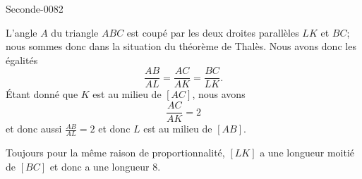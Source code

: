 
\begin{corrige}{Seconde-0082}


    \begin{multicols}{2}

        L'angle \( A\) du triangle \( ABC\) est coupé par les deux droites parallèles \( LK\) et \( BC\); nous sommes donc dans la situation du théorème de Thalès. Nous avons donc les égalités
        \begin{equation}
            \frac{ AB }{ AL }=\frac{ AC }{ AK }=\frac{ BC }{ LK }.
        \end{equation}
        Étant donné que \( K\) est au milieu de \( [AC]\), nous avons
        \begin{equation}
            \frac{ AC }{ AK }=2
        \end{equation}
        et donc aussi \( \frac{ AB }{ AL }=2\) et donc \( L\) est au milieu de \( [AB]\).

        Toujours pour la même raison de proportionnalité, \( [LK]\) a une longueur moitié de \( [BC]\) et donc a une longueur \( 8\).

        \columnbreak

        \begin{center}

        \end{center}

    \end{multicols}

\end{corrige}
